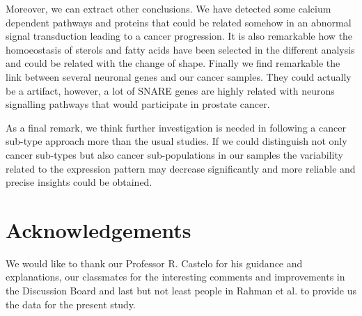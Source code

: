 \documentclass[9pt,twocolumn,twoside]{gsajnl}
\begin{document}
Moreover, we can extract other conclusions. We have detected some calcium dependent pathways and proteins that could be related somehow in an abnormal signal transduction leading to a cancer progression. It is also remarkable how the homoeostasis of sterols and fatty acids have been selected in the different analysis and could be related with the change of shape. Finally we find remarkable the link between several neuronal genes and our cancer samples. They could actually be a artifact, however, a lot of SNARE genes are highly related with neurons signalling pathways that would participate in prostate cancer. 

As a final remark, we think further investigation is needed in following a cancer sub-type approach more than the usual studies. If we could distinguish not only cancer sub-types but also cancer sub-populations in our samples the variability related to the expression pattern may decrease significantly and more reliable and precise insights could be obtained.

\section*{Acknowledgements}

We would like to thank our Professor R. Castelo for his guidance and explanations, our classmates for the interesting comments and improvements in the Discussion Board and last but not least people in Rahman et al. \cite{Rahman15112015} to provide us the data for the present study. 



\end{document}
